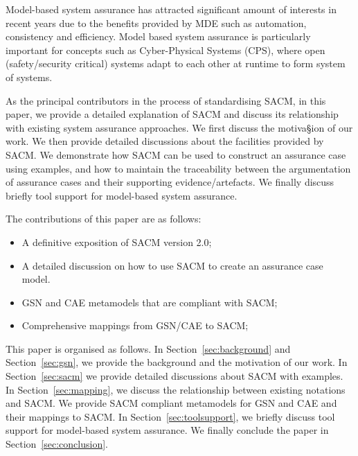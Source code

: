 Model-based system assurance has attracted significant amount of interests in recent years due to the benefits provided by MDE such as automation, consistency and efficiency. 
Model based system assurance is particularly important for concepts such as Cyber-Physical Systems (CPS), where open (safety/security critical) systems adapt to each other at runtime to form system of systems. 


As the principal contributors in the process of standardising SACM, in this paper, we provide a detailed explanation of SACM and discuss its relationship with existing system assurance approaches. 
We first discuss the motiva§ion of our work. 
We then provide detailed discussions about the facilities provided by SACM. 
We demonstrate how SACM can be used to construct an assurance case using examples, and how to maintain the traceability between the argumentation of assurance cases and their supporting evidence/artefacts. 
We finally discuss briefly tool support for model-based system assurance.

The contributions of this paper are as follows:
\begin{itemize}
	\item A definitive exposition of SACM version 2.0;
	\item A detailed discussion on how to use SACM to create an assurance case model.
	\item GSN and CAE metamodels that are compliant with SACM;
	\item Comprehensive mappings from GSN/CAE to SACM;
\end{itemize}

This paper is organised as follows. 
In Section~\ref{sec:background} and Section~\ref{sec:gsn}, we provide the background and the motivation of our work. 
In Section~\ref{sec:sacm} we provide detailed discussions about SACM with examples. 
In Section~\ref{sec:mapping}, we discuss the relationship between existing notations and SACM. 
We provide SACM compliant metamodels for GSN and CAE and their mappings to SACM. 
In Section~\ref{sec:toolsupport}, we briefly discuss tool support for model-based system assurance. 
We finally conclude the paper in Section~\ref{sec:conclusion}.

